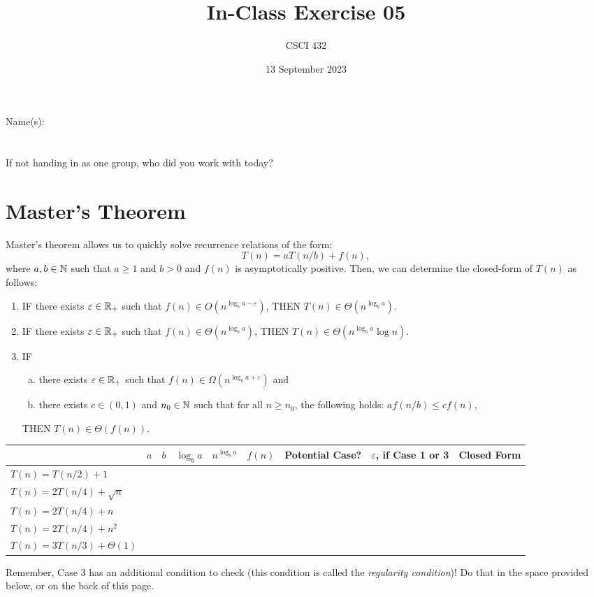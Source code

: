 \documentclass{article}
\title{In-Class Exercise 05}
\author{CSCI 432}
\date{13 September 2023}
\begin{document}
\maketitle

\noindent
Name(s):\\
\\~\\
If not handing in as one group, who did you work with today?

\section*{Master's Theorem}

Master's theorem allows us to quickly solve recurrence relations of the form:
$$ T(n) = a T(n/b) + f(n),$$
where $a, b \in {\mathbb N}$ such that $a \geq 1$ and $b >0$ and $f(n)$ is asymptotically
positive.  Then, we can determine the closed-form of $T(n)$ as follows:
\begin{enumerate}
    \item IF there exists $\varepsilon \in {\mathbb R}_+$ such that $f(n) \in O(n^{\log_b
        a - \varepsilon})$, THEN $T(n) \in \Theta(n^{\log_b a})$.
    \item IF there exists $\varepsilon \in {\mathbb R}_+$ such that $f(n) \in \Theta(n^{\log_b
        a})$, THEN $T(n) \in \Theta(n^{\log_b a}\log n)$.
    \item IF
        \begin{enumerate}[(a)]
            \item there exists $\varepsilon \in {\mathbb R}_+$ such that $f(n) \in \Omega(n^{\log_b
                a + \varepsilon})$ and
            \item there exists $c \in (0,1)$ and $n_0 \in {\mathbb N}$ such that for all $n
                \geq n_0$, the following holds: $a f(n/b) \leq c
                f(n)$,\label{regularity}
        \end{enumerate}
        THEN $T(n) \in \Theta(f(n))$.
\end{enumerate}

\pagebreak

\begin{table}[h!]
    \centering
    \begin{tabular}{|l|l|l|l|l|l|l|l|l|}
        \hline
        &  $a$ & $b$  & $\log_b a$  & $n^{\log_b a}$  & $f(n)$  & Potential
        Case? & $\varepsilon$, if Case 1 or 3  & Closed Form \\ \hline
        \hline
        $T(n) = T(n/2)+1$             & &  &  &  &  & & & \\[5ex] \hline
        $T(n) = 2 T(n/4) + \sqrt{n}$  & &  &  &  & &  & & \\[5ex] \hline
        $T(n) = 2 T(n/4) + n$         & &  &  &  &  & & &  \\[5ex] \hline
        $T(n) = 2 T(n/4) + n^2$       & &  &  &  &  & & & \\[5ex] \hline
        $T(n) = 3 T(n/3) + \Theta(1)$ & &  &  &  & & & & \\[5ex] \hline
    \end{tabular}
\end{table}

Remember, Case 3 has an additional condition to check (this condition
is called the
\emph{regularity condition})! Do that in the space
provided below, or on the back of this page.
\end{document}
